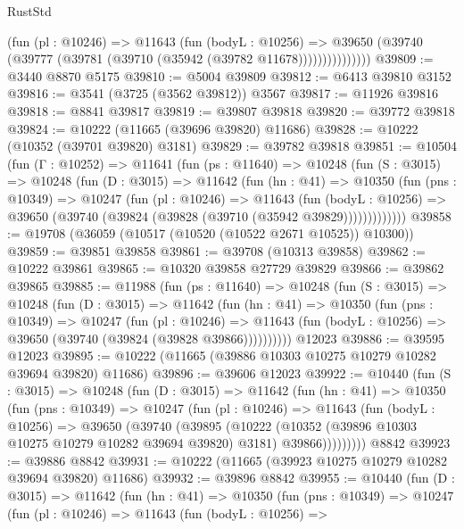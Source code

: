 \begin{lexlean}{RustStd}
\begin{coremodule}
                  (fun (pl : @10246) =>
                  @11643
                    (fun (bodyL : @10256) =>
                    @39650 (@39740 (@39777 (@39781 (@39710 (@35942 (@39782 @11678)))))))))))))))
@39809 := @3440 @8870 @5175
@39810 := @5004 @39809
@39812 := @6413 @39810 @3152
@39816 := @3541 (@3725 (@3562 @39812)) @3567
@39817 := @11926 @39816
@39818 := @8841 @39817
@39819 := @39807 @39818
@39820 := @39772 @39818
@39824 := @10222 (@11665 (@39696 @39820) @11686)
@39828 := @10222 (@10352 (@39701 @39820) @3181)
@39829 := @39782 @39818
@39851 := @10504
    (fun (Γ : @10252) =>
    @11641
      (fun (ps : @11640) =>
      @10248
        (fun (S : @3015) =>
        @10248
          (fun (D : @3015) =>
          @11642
            (fun (hn : @41) =>
            @10350
              (fun (pns : @10349) =>
              @10247
                (fun (pl : @10246) =>
                @11643
                  (fun (bodyL : @10256) =>
                  @39650 (@39740 (@39824 (@39828 (@39710 (@35942 @39829)))))))))))))
@39858 := @19708 (@36059 (@10517 (@10520 (@10522 @2671 @10525)) @10300))
@39859 := @39851 @39858
@39861 := @39708 (@10313 @39858)
@39862 := @10222 @39861
@39865 := @10320 @39858 @27729 @39829
@39866 := @39862 @39865
@39885 := @11988
    (fun (ps : @11640) =>
    @10248
      (fun (S : @3015) =>
      @10248
        (fun (D : @3015) =>
        @11642
          (fun (hn : @41) =>
          @10350
            (fun (pns : @10349) =>
            @10247
              (fun (pl : @10246) =>
              @11643 (fun (bodyL : @10256) => @39650 (@39740 (@39824 (@39828 @39866))))))))))
    @12023
@39886 := @39595 @12023
@39895 := @10222 (@11665 (@39886 @10303 @10275 @10279 @10282 @39694 @39820) @11686)
@39896 := @39606 @12023
@39922 := @10440
    (fun (S : @3015) =>
    @10248
      (fun (D : @3015) =>
      @11642
        (fun (hn : @41) =>
        @10350
          (fun (pns : @10349) =>
          @10247
            (fun (pl : @10246) =>
            @11643
              (fun (bodyL : @10256) =>
              @39650
                (@39740
                  (@39895
                    (@10222
                      (@10352 (@39896 @10303 @10275 @10279 @10282 @39694 @39820) @3181)
                      @39866)))))))))
    @8842
@39923 := @39886 @8842
@39931 := @10222 (@11665 (@39923 @10275 @10279 @10282 @39694 @39820) @11686)
@39932 := @39896 @8842
@39955 := @10440
    (fun (D : @3015) =>
    @11642
      (fun (hn : @41) =>
      @10350
        (fun (pns : @10349) =>
        @10247
          (fun (pl : @10246) =>
          @11643
            (fun (bodyL : @10256) =>

\end{coremodule}
\end{lexlean}
